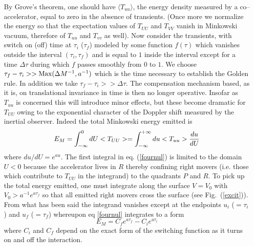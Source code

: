 \documentclass[12pt,oneside]{report}
\begin{document}
By Grove's theorem, one should have $\langle T_{uu} \rangle$, the energy
density measured by a co--accelerator, equal to zero in the absence of
transients. (Once more we normalize the energy so that the expectation values of
$T_{UU}$ and $T_{VV}$ vanish in Minkowski vacuum, therefore of 
$T_{uu}$ and $T_{vv}$ as well). Now consider the transients, with switch
on (off) time at $\tau_i$ ($\tau_f$) modeled by some function $f(\tau)$
which vanishes outside the interval $(\tau_i , \tau_f )$ and is equal to $1$
inside the interval except for a time $\Delta \tau$ during which $f$ passes
smoothly from $0$ to $1$. We choose $\tau_f - \tau_i >> {\rm Max} (\Delta M
^{-1}, a^{-1})$ which is the time necessary to establish the Golden rule.
In addition we take $\tau_f - \tau_i >> \Delta \tau$. The compensation
mechanism based, as it is, on translational invariance in time is then no
longer operative. Insofar as $T_{uu}$ is concerned this will introduce minor
effects, but these become dramatic for $T_{UU}$ owing to the exponential
character of the Doppler shift measured by the inertial observer. Indeed the
total Minkowski energy emitted is \begin{equation} E_M = \int_{ - \infty}^{0}
dU <T_{UU}> =  \int_{ - \infty}^{+ \infty} du <T_{uu}> {du \over dU}
\label{fournul} \end{equation}
where $du / dU = e^{au}$. The first integral in eq. (\ref{fournul}) is limited
to the domain $U<0$ because the accelerator lives in $R$ thereby confining
right movers (i.e. those which contribute to $T_{UU}$ in the integrand) to
the quadrants $P$ and $R$. To pick up the total energy emitted, one
must integrate along the surface $V=V_0$ with $V_0 > a^{-1}e^{a\tau_f }$ so 
that all emitted right movers cross 
the surface (see Fig.~(\ref{excit})). From what has been said 
the integrand vanishes except
at the endpoints $u_i$ ($= \tau_i $) and $u_f$ ($= \tau_f $) whereupon eq
\ref{fournul} integrates to a form \begin{equation} E_M = C_f e^{a \tau_f} -
C_i e^{a \tau_i} \label{fourone}
\end{equation}
where $C_i$ and $C_f$ depend on the exact form of the switching function as
it turns on and off the interaction.
\end{document}
